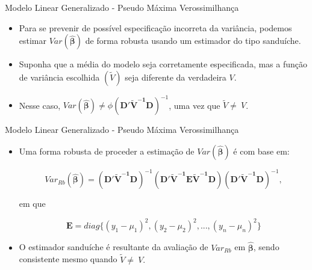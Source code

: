 \documentclass[10pt, aspectratio=169]{beamer}
\begin{document}

\begin{frame}{Modelo Linear Generalizado - Pseudo Máxima Verossimilhança} 

\begin{itemize}



\item Para se prevenir de possível especificação incorreta da variância, podemos estimar $Var(\boldsymbol{\hat{\beta}})$ de forma robusta usando um estimador do tipo sanduíche.

\vspace{0.5cm}

\item Suponha que a média do modelo seja corretamente especificada, mas a função de variância escolhida $(\tilde{V})$ seja diferente da verdadeira $V$.

\vspace{0.5cm}

\item Nesse caso,  $ Var(\boldsymbol{\hat{\beta}}) \neq \phi \boldsymbol{(D'\tilde{V}^{-1}D)} ^{-1}$, uma vez que $\tilde{V} \neq \ V$. 

\end{itemize}

\end{frame}



\begin{frame}{Modelo Linear Generalizado - Pseudo Máxima Verossimilhança} 

\begin{itemize}


\item Uma forma robusta de proceder a estimação de  $ Var(\boldsymbol{\hat{\beta}})$ é com base em:

$$ Var_{Rb}(\boldsymbol{\hat{\beta}})=
\boldsymbol{(D'\tilde{V}^{-1}D)} ^{-1}
 \boldsymbol{(D'\tilde{V}^{-1}E\tilde{V}^{-1}D)}  
\boldsymbol{(D'\tilde{V}^{-1}D)} ^{-1},$$

em que 

$$ \boldsymbol{E} = diag\{(y_1-\mu_1)^2,(y_2-\mu_2)^2,...,(y_n-\mu_n)^2\}$$

\vspace{0.5cm}

\item O estimador sanduíche é resultante da avaliação de $Var_{Rb}$ em $\boldsymbol{\hat{\beta}}$, sendo consistente mesmo quando  $\tilde{V} \neq\ V.$   

\end{itemize}

\end{frame}
\end{document}
